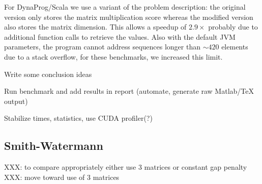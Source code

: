 \documentclass[11pt]{article}
\begin{document}
For DynaProg/Scala we use a variant of the problem description: the original version only stores the matrix multiplication score whereas the modified version also stores the matrix dimension. This allows a speedup of $2.9\times$ probably due to additional function calls to retrieve the values. Also with the default JVM parameters, the program cannot address sequences longer than $\sim 420$ elements due to a stack overflow, for these benchmarks, we increased this limit.





{\color{red}\ol
\item Write some conclusion ideas
\item Run benchmark and add results in report (automate, generate raw Matlab/TeX output)
\item Stabilize times, statistics, use CUDA profiler(?)
\ole}

\subsection{Smith-Watermann}
XXX: to compare appropriately either use 3 matrices or constant gap penalty
XXX: move toward use of 3 matrices
\end{document}
